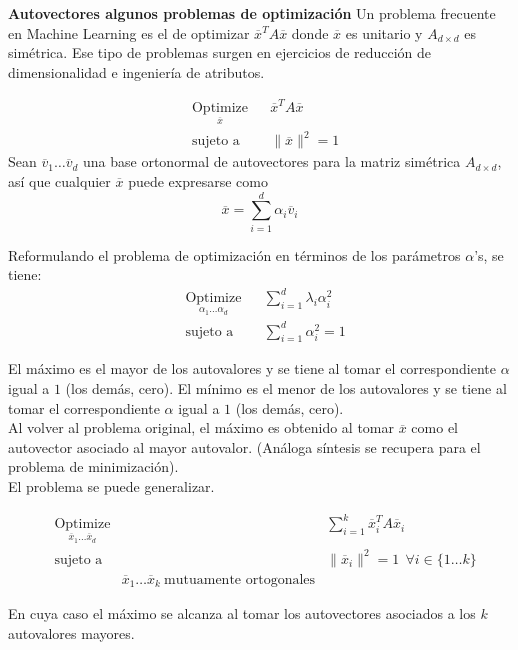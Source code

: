 \documentclass{article}
\begin{document}
\textbf{Autovectores algunos problemas de optimización}
Un problema frecuente en Machine Learning es el de optimizar $\overline{x} ^{T}A\overline{x} $ donde $\overline{x}$ es unitario y $A _{d\times d} $ es simétrica. Ese tipo de problemas surgen en ejercicios de reducción de dimensionalidad e ingeniería de atributos.

\begin{equation*}
\begin{aligned}
& \underset{\overline{x} }{\text{Optimize}}
& & \overline{x} ^{T}A \overline{x}    \\
& \text{sujeto a}
& & \| \overline{x}\| ^{ 2} = 1
\end{aligned}
\end{equation*}
Sean $\overline{v} _{ 1}  \ldots \overline{v} _{ d} $ una base ortonormal de autovectores para la matriz simétrica $A _{d\times d} $, así que cualquier $\overline{x}$ puede expresarse como $$\overline{x} = \displaystyle \sum _{ i=1} ^{ d} \alpha _{ i} \overline{v} _{ i}   $$

Reformulando el problema de optimización en términos de los parámetros $\alpha$'s, se tiene:
\begin{equation*}
\begin{aligned}
& \underset{\alpha _{ 1} \ldots \alpha _{ d}  }{\text{Optimize}}
& & \displaystyle \sum _{ i=1} ^{d} \lambda _{ i} \alpha _{ i} ^{ 2}       \\
& \text{sujeto a}
& & \sum _{ i=1} ^{d}  \alpha _{ i} ^{ 2}=1
\end{aligned}
\end{equation*}

El máximo es el mayor de los autovalores y se tiene al tomar el correspondiente $\alpha$ igual a $1$ (los demás, cero).
El mínimo es el menor de los autovalores y se tiene al tomar el correspondiente $\alpha$ igual a $1$ (los demás, cero).  \\

Al volver al problema original, el máximo es obtenido al tomar $\overline{x}$ como el autovector asociado al mayor autovalor. (Análoga síntesis se recupera para el problema de minimización).\\

El problema se puede generalizar.

\begin{equation*}
\begin{aligned}
& \underset{\overline{x} _{ 1} \ldots \overline{x} _{ d}  }{\text{Optimize}}
& & \displaystyle \sum _{i=1} ^{ k}   \overline{x} _{ i}  ^{T}A \overline{x} _{ i}     \\
& \text{sujeto a}
& & \| \overline{x} _{ i} \| ^{ 2} = 1 \ \ \forall i \in \{1 \ldots k\} \\
& & \overline{x} _{ 1} \ldots \overline{x} _{k } \ \text{mutuamente ortogonales}
\end{aligned}
\end{equation*}

En cuya caso el máximo se alcanza al tomar los autovectores asociados a los $k$ autovalores mayores.\\ 
\end{document}
